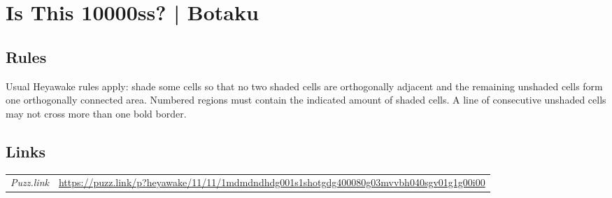 \section[Is This 10000ss? | Botaku {[\emph{Heyawake}]}]{Is This 10000ss? | {\normalfont Botaku}}
\label{sec:20-is-this-10000ss-botaku}

\subsection*{Rules}
\begin{markdown}
Usual Heyawake rules apply: shade some cells so that no two shaded cells are orthogonally adjacent and the remaining unshaded cells form one orthogonally connected area. Numbered regions must contain the indicated amount of shaded cells. A line of consecutive unshaded cells may not cross more than one bold border.
\end{markdown}
\subsection*{Links}
\begin{tabularx}{\textwidth}{l X}
\emph{Puzz.link} & \url{https://puzz.link/p?heyawake/11/11/1mdmdndhdg001s1shotgdg400080g03mvvbh040sgv01g1g00i00} \\
\end{tabularx}
\pagebreak
